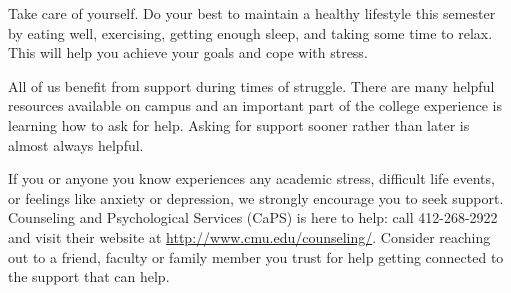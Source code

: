 \begin{gram}
Take care of yourself. Do your best to maintain a healthy lifestyle this semester by eating well, exercising, getting enough sleep, and taking some time to relax. This will help you achieve your goals and cope with stress.


All of us benefit from support during times of struggle. There are many helpful resources available on campus and an important part of the college experience is learning how to ask for help. Asking for support sooner rather than later is almost always helpful.

If you or anyone you know experiences any academic stress, difficult life events, or feelings like anxiety or depression, we strongly encourage you to seek support. Counseling and Psychological Services (CaPS) is here to help: call 412-268-2922 and visit their website at \href{http://www.cmu.edu/counseling}{http://www.cmu.edu/counseling/}. Consider reaching out to a friend, faculty or family member you trust for help getting connected to the support that can help.
\end{gram}
